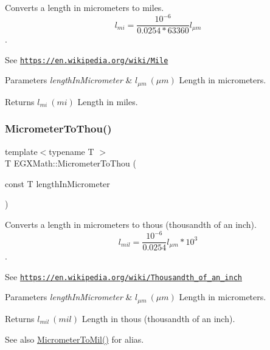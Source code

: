 Converts a length in micrometers to miles. \[ l_{mi}=\frac{10^{-6}}{0.0254 * 63360} l_{\mu m} \]. 

See \href{https://en.wikipedia.org/wiki/Mile}{\tt https\+://en.\+wikipedia.\+org/wiki/\+Mile} 
\begin{DoxyParams}{Parameters}
{\em length\+In\+Micrometer} & $ l_{\mu m}\ (\mu m)$ Length in micrometers. \\
\hline
\end{DoxyParams}
\begin{DoxyReturn}{Returns}
$ l_{mi}\ (mi)$ Length in miles. 
\end{DoxyReturn}
\mbox{\label{group___e_g_x_math-_conversions-_length_conversions-_s_i-_micrometer-_imperial_ga8a2cfa132c629695ff469f66e1ab5919}} 
\subsubsection{\texorpdfstring{Micrometer\+To\+Thou()}{MicrometerToThou()}}
{\footnotesize\ttfamily template$<$typename T $>$ \\
T E\+G\+X\+Math\+::\+Micrometer\+To\+Thou (\begin{DoxyParamCaption}\item[{const T}]{length\+In\+Micrometer }\end{DoxyParamCaption})}



Converts a length in micrometers to thous (thousandth of an inch). \[ l_{mil}= \frac{10^{-6}}{0.0254} l_{\mu m} * 10^{3} \]. 

See \href{https://en.wikipedia.org/wiki/Thousandth_of_an_inch}{\tt https\+://en.\+wikipedia.\+org/wiki/\+Thousandth\+\_\+of\+\_\+an\+\_\+inch} 
\begin{DoxyParams}{Parameters}
{\em length\+In\+Micrometer} & $ l_{\mu m}\ (\mu m)$ Length in micrometers. \\
\hline
\end{DoxyParams}
\begin{DoxyReturn}{Returns}
$ l_{mil}\ (mil)$ Length in thous (thousandth of an inch). 
\end{DoxyReturn}
\begin{DoxySeeAlso}{See also}
\mbox{\hyperlink{group___e_g_x_math-_conversions-_length_conversions-_s_i-_micrometer-_imperial_ga94d0f5a6ba598898a13e3a8837d7c681}{Micrometer\+To\+Mil()}} for alias. 
\end{DoxySeeAlso}
\mbox{\label{group___e_g_x_math-_conversions-_length_conversions-_s_i-_micrometer-_imperial_ga3152a5a36ea33c2ab85fe275569f5ac0}} 
